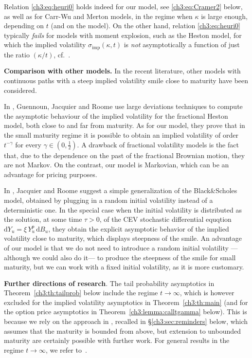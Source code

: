 \documentclass[a4paper,reqno,11pt]{amsart}
\numberwithin{equation}{section}
\newcommand{\dd}{\text{\rm d}}             %
\def\dd{\mathrm{d}}
\newcommand\imp{\mathrm{imp}}
\begin{document}
Relation \eqref{ch3:eq:heuri0}
holds indeed for our model, see \eqref{ch3:eq:Cramer2} below,
as well as for Carr-Wu and Merton models, 
in the regime when $\kappa$ 
is large enough, depending on $t$ (and on the model).
On the other hand, relation \eqref{ch3:eq:heuri0} 
typically \emph{fails} for models with moment explosion, such as the Heston model,
for which the implied volatility $\sigma_\imp(\kappa,t)$ is \emph{not} asymptotically
a function of just the ratio $(\kappa/t)$, cf.\ \cite[\S 3.3]{cf:CC}.

\medskip
\noindent
\textbf{Comparison with other models.} In the recent literature,
other models with continuous paths with a steep implied volatility 
smile close to maturity have been considered. 

In \cite{cf:GJR}, Guennoun, Jacquier and Roome
use large deviations techniques to compute
the asymptotic behaviour of the implied volatility for the fractional Heston model,
both close to and far from maturity.
As for our model, they prove that in the small maturity regime it is possible to obtain 
an implied volatility of order $t^{-\gamma}$ for every  $\gamma \in (0,\frac 12)$. 
A drawback of fractional volatility models is the fact that, due to the dependence 
on the past of the fractional Brownian motion, they are not Markov.
On the contrast, our model is Markovian, which can be an advantage for pricing purposes.

In \cite{cf:JR}, Jacquier and Roome suggest a simple generalization of the Black\&Scholes 
model, obtained by plugging in a random initial volatility instead of a deterministic one.  
In the special case when the initial volatility is distributed as the solution, 
at some time $\tau>0$, of the CEV stochastic differential equqtion 
$\dd Y_u=\xi \, Y_u^p \, \dd B_u$, 
they obtain the explicit asymptotic behavior of the implied volatility close to maturity,
which displays steepness of the smile.
An advantage of our model is that we do not need to introduce a random initial
volatility ---although we could also do it--- 
to produce the steepness of the smile for small maturity, but we
can work with a fixed initial volatility, as it is more customary.

\medskip
\noindent
\textbf{Further directions of research}.
The tail probability asymptotics in Theorem~\ref{ch3:th:tailprob} below
include the regime $t \to \infty$, which is however excluded for
the implied volatility asymptotics in Theorem~\ref{ch3:th:main} (and for
the option price asymptotics in
Theorem~\ref{ch3:lemma:calltgamma} below). This is because 
we rely on the approach in \cite{cf:CC}, recalled in \S\ref{ch3:sec:reminders} below, which
assumes that the maturity is bounded from above, but extension to unbounded
maturity are certainly possible with further work.
For general results in the
regime $t \to \infty$, we refer to~\cite{cf:T09}.
\end{document}
